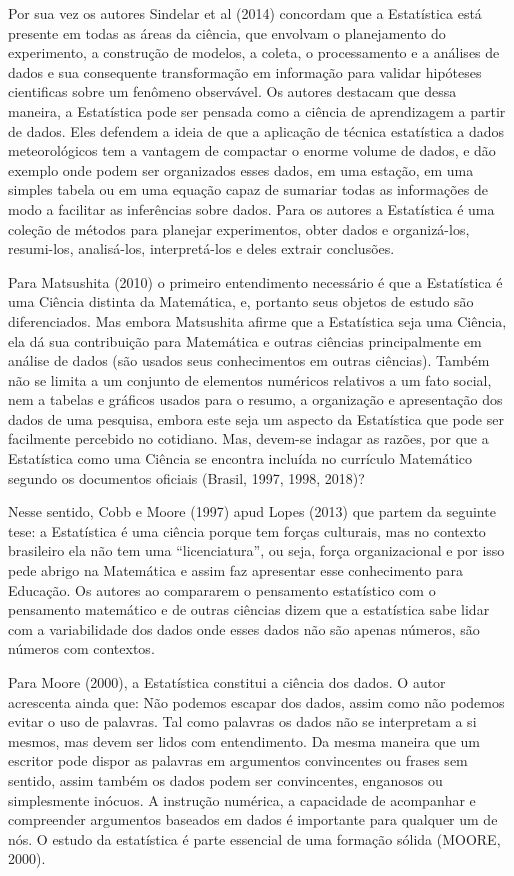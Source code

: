Por sua vez os autores Sindelar et al (2014) concordam que a Estatística está presente em todas as áreas da ciência, que envolvam o planejamento do experimento, a construção de modelos, a coleta, o processamento e a análises de dados e sua consequente transformação em informação para validar hipóteses cientificas sobre um fenômeno observável. Os autores destacam que dessa maneira, a Estatística pode ser pensada como a ciência de aprendizagem a partir de dados. Eles defendem a ideia de que a aplicação de técnica estatística a dados meteorológicos tem a vantagem de compactar o enorme volume de dados, e dão exemplo onde podem ser organizados esses dados, em uma estação, em uma simples tabela ou em uma equação capaz de sumariar todas as informações de modo a facilitar as inferências sobre dados. Para os autores a Estatística é uma coleção de métodos para planejar experimentos, obter dados e organizá-los, resumi-los, analisá-los, interpretá-los e deles extrair conclusões. \vskip0.3cm

\newpage
Para Matsushita (2010) o primeiro entendimento necessário é que a Estatística é uma Ciência distinta da Matemática, e, portanto seus objetos de estudo são diferenciados. Mas embora Matsushita afirme que a Estatística seja uma Ciência, ela dá sua contribuição para Matemática e outras ciências principalmente em análise de dados (são usados seus conhecimentos em outras ciências). Também não se limita a um conjunto de elementos numéricos relativos a um fato social, nem a tabelas e gráficos usados para o resumo, a organização e apresentação dos dados de uma pesquisa, embora este seja um aspecto da Estatística que pode ser facilmente percebido no cotidiano. Mas, devem-se indagar as razões, por que a Estatística como uma Ciência se encontra incluída no currículo Matemático segundo os documentos oficiais (Brasil, 1997, 1998, 2018)? \vskip0.3cm


Nesse sentido, Cobb e Moore (1997) apud Lopes (2013) que partem da seguinte tese: a Estatística é uma ciência porque tem forças culturais, mas no contexto brasileiro ela não tem uma “licenciatura”, ou seja, força organizacional e por isso pede abrigo na Matemática e assim faz apresentar esse conhecimento para Educação. Os autores ao compararem o pensamento estatístico com o pensamento matemático e de outras ciências dizem que a estatística sabe lidar com a variabilidade dos dados onde esses dados não são apenas números, são números com contextos. \vskip0.3cm

Para Moore (2000), a Estatística constitui a ciência dos dados. O autor acrescenta ainda que: Não podemos escapar dos dados, assim como não podemos evitar o uso de palavras. Tal como palavras os dados não se interpretam a si mesmos, mas devem ser lidos com entendimento. Da mesma maneira que um escritor pode dispor as palavras em argumentos convincentes ou frases sem sentido, assim também os dados podem ser convincentes, enganosos ou simplesmente inócuos. A instrução numérica, a capacidade de acompanhar e compreender argumentos baseados em dados é importante para qualquer um de nós. O estudo da estatística é parte essencial de uma formação sólida (MOORE, 2000).\vskip0.3cm


